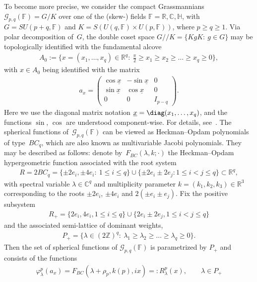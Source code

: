 To become more precise, we consider the compact Grassmannians $\mathcal G_{p,q}(\mathbb F)=G/K$ over one of the (skew-)
f\/ields $\mathbb F= \mathbb R, \mathbb C, \mathbb H$, with $G=SU(p+q,\mathbb F)$ and $K=S(U(q, \mathbb F)\times
U(p,\mathbb F))$, where $p\ge q\ge 1$.
Via polar decomposition of~$G$, the double coset space $G//K=\{KgK:\> g\in G\}$ may be topologically identif\/ied with the
fundamental alcove
\begin{gather*}
A_0:=\Big\{x=(x_1,\ldots,x_q)\in\mathbb R^q:\> \frac{\pi}{2}\ge x_1\ge x_2\ge\dots\ge x_q\ge0\Big\},
\end{gather*}
with $x\in A_0$ being identif\/ied with the matrix
\begin{gather*}
a_x=
\begin{pmatrix}
\cos\underline x & -\sin \underline x & 0
\\
\sin \underline x & \cos \underline x & 0
\\
0 & 0 & I_{p-q}
\end{pmatrix}
.
\end{gather*}
Here we use the diagonal matrix notation $\underline x=\diag(x_1,\ldots,x_q)$, and the functions $\sin$, $\cos$ are
understood component-wise.
For details, see~\cite[Theorem~4.1]{RR}.
The spherical functions of~$\mathcal G_{p,q}(\mathbb F)$ can be viewed as Heckman--Opdam polynomials of type~$BC_q$,
which are also known as multivariable Jacobi polynomials.
They may be described as follows: denote by~$F_{BC}(\lambda,k;\cdot)$ the Heckman--Opdam hypergeometric function
associated with the root system
\begin{gather*}
R=2  BC_q=\{\pm 2e_i, \pm 4 e_i: \> 1\leq i\le q\}\cup\{\pm 2e_i \pm 2e_j: 1\leq i < j \leq q\} \subset \mathbb R^q,
\end{gather*}
with spectral variable $\lambda\in\mathbb C^q$ and multiplicity parameter $k=(k_1, k_2, k_3)\in \mathbb R^3$
corresponding to the roots $\pm 2 e_i$, $\pm 4 e_i$ and $2(\pm e_i\pm e_j)$.
Fix the positive subsystem
\begin{gather*}
R_+=\{2e_i, 4e_i, 1\leq i \leq q\}\cup\{2e_i\pm 2e_j, 1\leq i<j \leq q\}
\end{gather*}
and the associated semi-lattice of dominant weights,
\begin{gather*}
P_+=\big\{\lambda\in (2\mathbb Z)^q: \> \lambda_1\ge\lambda_2\ge\dots\ge\lambda_q\ge0\big\}.
\end{gather*}
Then the set of spherical functions of $\mathcal G_{p,q}(\mathbb F)$ is parametrized by $P_+$ and consists of the
functions
\begin{gather}
\label{jacobi-pol-def}
\varphi_\lambda^p(a_x)=F_{BC}(\lambda+\rho_p, k(p),ix)=: R_\lambda^p(x),
\qquad
\lambda\in P_+
\end{gather}
